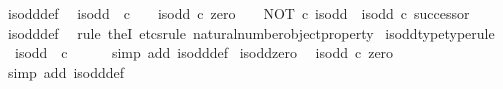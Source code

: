 \begin{isabellebody}
\isanewline
{}\isamarkupfalse%
\ is{\isacharunderscore}{\kern0pt}odd{\isacharunderscore}{\kern0pt}def{}{\isacharcolon}{\kern0pt}\isanewline
\ \ {\isachardoublequoteopen}is{\isacharunderscore}{\kern0pt}odd\ {\isacharcolon}{\kern0pt}\ {\isasymnat}\isactrlsub c\ {\isasymrightarrow}\ {\isasymOmega}\ {\isasymand}\ is{\isacharunderscore}{\kern0pt}odd\ {\isasymcirc}\isactrlsub c\ zero\ {\isacharequal}{\kern0pt}\ {\isasymf}\ {\isasymand}\ NOT\ {\isasymcirc}\isactrlsub c\ is{\isacharunderscore}{\kern0pt}odd\ {\isacharequal}{\kern0pt}\ is{\isacharunderscore}{\kern0pt}odd\ {\isasymcirc}\isactrlsub c\ successor{\isachardoublequoteclose}\isanewline
%
\isadelimproof
\ \ %
\endisadelimproof
%
\isatagproof
{}\isamarkupfalse%
\ is{\isacharunderscore}{\kern0pt}odd{\isacharunderscore}{\kern0pt}def\ \isamarkupfalse%
\ {\isacharparenleft}{\kern0pt}rule\ theI{\isacharprime}{\kern0pt}{\isacharcomma}{\kern0pt}\ etcs{\isacharunderscore}{\kern0pt}rule\ natural{\isacharunderscore}{\kern0pt}number{\isacharunderscore}{\kern0pt}object{\isacharunderscore}{\kern0pt}property{}{\isacharparenright}{\kern0pt}%
\endisatagproof
{\isafoldproof}%
%
\isadelimproof
\isanewline
%
\endisadelimproof
\isanewline
{}\isamarkupfalse%
\ is{\isacharunderscore}{\kern0pt}odd{\isacharunderscore}{\kern0pt}type{\isacharbrackleft}{\kern0pt}type{\isacharunderscore}{\kern0pt}rule{\isacharbrackright}{\kern0pt}{\isacharcolon}{\kern0pt}\isanewline
\ \ {\isachardoublequoteopen}is{\isacharunderscore}{\kern0pt}odd\ {\isacharcolon}{\kern0pt}\ {\isasymnat}\isactrlsub c\ {\isasymrightarrow}\ {\isasymOmega}{\isachardoublequoteclose}\isanewline
%
\isadelimproof
\ \ %
\endisadelimproof
%
\isatagproof
{}\isamarkupfalse%
\ {\isacharparenleft}{\kern0pt}simp\ add{\isacharcolon}{\kern0pt}\ is{\isacharunderscore}{\kern0pt}odd{\isacharunderscore}{\kern0pt}def{}{\isacharparenright}{\kern0pt}%
\endisatagproof
{\isafoldproof}%
%
\isadelimproof
\isanewline
%
\endisadelimproof
\isanewline
{}\isamarkupfalse%
\ is{\isacharunderscore}{\kern0pt}odd{\isacharunderscore}{\kern0pt}zero{\isacharcolon}{\kern0pt}\isanewline
\ \ {\isachardoublequoteopen}is{\isacharunderscore}{\kern0pt}odd\ {\isasymcirc}\isactrlsub c\ zero\ {\isacharequal}{\kern0pt}\ {\isasymf}{\isachardoublequoteclose}\isanewline
%
\isadelimproof
\ \ %
\endisadelimproof
%
\isatagproof
{}\isamarkupfalse%
\ {\isacharparenleft}{\kern0pt}simp\ add{\isacharcolon}{\kern0pt}\ is{\isacharunderscore}{\kern0pt}odd{\isacharunderscore}{\kern0pt}def{}{\isacharparenright}{\kern0pt}%

\end{isabellebody}
